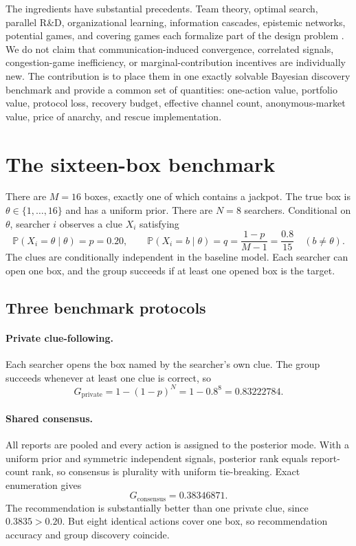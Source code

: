 \documentclass[11pt]{article}
\theoremstyle{definition}
\theoremstyle{remark}
\newcommand{\Prob}{\mathbb{P}}
\newcommand{\1}{\mathbf{1}}
\newcommand{\priv}{\mathrm{private}}
\newcommand{\cons}{\mathrm{consensus}}
\begin{document}
The ingredients have substantial precedents. Team theory, optimal search, parallel R\&D, organizational learning, information cascades, epistemic networks, potential games, and covering games each formalize part of the design problem \citep{MarschakRadner1972,Koopman1957,Nelson1961,March1991,Banerjee1992,BikhchandaniEtAl1992,Zollman2007,MondererShapley1996,Gairing2009}. We do not claim that communication-induced convergence, correlated signals, congestion-game inefficiency, or marginal-contribution incentives are individually new. The contribution is to place them in one exactly solvable Bayesian discovery benchmark and provide a common set of quantities: one-action value, portfolio value, protocol loss, recovery budget, effective channel count, anonymous-market value, price of anarchy, and rescue implementation.

\section{The sixteen-box benchmark}
\label{sec:benchmark}

There are $M=16$ boxes, exactly one of which contains a jackpot. The true box is $\theta\in\{1,\ldots,16\}$ and has a uniform prior. There are $N=8$ searchers. Conditional on $\theta$, searcher $i$ observes a clue $X_i$ satisfying
\[
\Prob(X_i=\theta\mid\theta)=p=0.20,
\qquad
\Prob(X_i=b\mid\theta)=q=\frac{1-p}{M-1}=\frac{0.8}{15}
\quad(b\neq\theta).
\]
The clues are conditionally independent in the baseline model. Each searcher can open one box, and the group succeeds if at least one opened box is the target.

\subsection{Three benchmark protocols}

\paragraph{Private clue-following.}
Each searcher opens the box named by the searcher's own clue. The group succeeds whenever at least one clue is correct, so
\begin{equation}
G_{\priv}=1-(1-p)^N=1-0.8^8=0.83222784.
\label{eq:private}
\end{equation}

\paragraph{Shared consensus.}
All reports are pooled and every action is assigned to the posterior mode. With a uniform prior and symmetric independent signals, posterior rank equals report-count rank, so consensus is plurality with uniform tie-breaking. Exact enumeration gives
\begin{equation}
G_{\cons}=0.38346871.
\label{eq:consensus}
\end{equation}
The recommendation is substantially better than one private clue, since $0.3835>0.20$. But eight identical actions cover one box, so recommendation accuracy and group discovery coincide.
\end{document}
